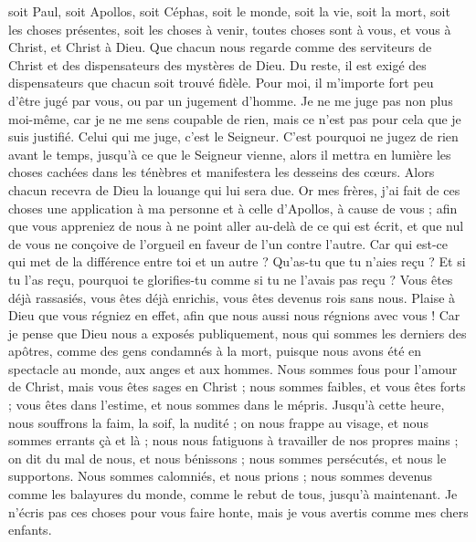 \begin{multicols}{2}
soit Paul, soit Apollos, soit Céphas, soit le monde, soit la vie, soit la mort, soit les choses présentes, soit les choses à venir, toutes choses sont à vous,
et vous à Christ, et Christ à Dieu.
\VerseOne{}Que chacun nous regarde comme des serviteurs de Christ et des dispensateurs des mystères de Dieu.
Du reste, il est exigé des dispensateurs que chacun soit trouvé fidèle.
Pour moi, il m’importe fort peu d'être jugé par vous, ou par un jugement d'homme. Je ne me juge pas non plus moi-même, car je ne me sens coupable de rien,
mais ce n’est pas pour cela que je suis justifié. Celui qui me juge, c'est le Seigneur.
C'est pourquoi ne jugez de rien avant le temps, jusqu'à ce que le Seigneur vienne, alors il mettra en lumière les choses cachées dans les ténèbres et manifestera les desseins des cœurs. Alors chacun recevra de Dieu la louange qui lui sera due.
Or mes frères, j’ai fait de ces choses une application à ma personne et à celle d’Apollos, à cause de vous ; afin que vous appreniez de nous à ne point aller au-delà de ce qui est écrit, et que nul de vous ne conçoive de l’orgueil en faveur de l’un contre l’autre.
Car qui est-ce qui met de la différence entre toi et un autre ? Qu’as-tu que tu n’aies reçu ? Et si tu l'as reçu, pourquoi te glorifies-tu comme si tu ne l'avais pas reçu ?
Vous êtes déjà rassasiés, vous êtes déjà enrichis, vous êtes devenus rois sans nous. Plaise à Dieu que vous régniez en effet, afin que nous aussi nous régnions avec vous !
Car je pense que Dieu nous a exposés publiquement, nous qui sommes les derniers des apôtres, comme des gens condamnés à la mort, puisque nous avons été en spectacle au monde, aux anges et aux hommes.
Nous sommes fous pour l'amour de Christ, mais vous êtes sages en Christ ; nous sommes faibles, et vous êtes forts ; vous êtes dans l'estime, et nous sommes dans le mépris.
Jusqu'à cette heure, nous souffrons la faim, la soif, la nudité ; on nous frappe au visage, et nous sommes errants çà et là ;
nous nous fatiguons à travailler de nos propres mains ; on dit du mal de nous, et nous bénissons ; nous sommes persécutés, et nous le supportons.
Nous sommes calomniés, et nous prions ; nous sommes devenus comme les balayures du monde, comme le rebut de tous, jusqu'à maintenant.
Je n'écris pas ces choses pour vous faire honte, mais je vous avertis comme mes chers enfants.

\end{multicols}
